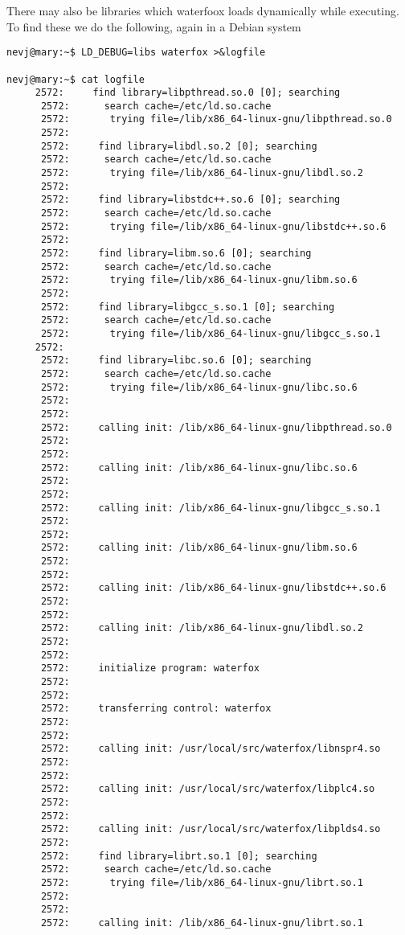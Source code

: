 \documentclass[a4paper]{article}  %
\begin{document}
 There may also be libraries which waterfoox loads dynamically while executing. To find these we do the following, again in a Debian system
\begin{tcolorbox}
\begin{verbatim}
nevj@mary:~$ LD_DEBUG=libs waterfox >&logfile

nevj@mary:~$ cat logfile
     2572:     find library=libpthread.so.0 [0]; searching
      2572:      search cache=/etc/ld.so.cache
      2572:       trying file=/lib/x86_64-linux-gnu/libpthread.so.0
      2572:
      2572:     find library=libdl.so.2 [0]; searching
      2572:      search cache=/etc/ld.so.cache
      2572:       trying file=/lib/x86_64-linux-gnu/libdl.so.2
      2572:
      2572:     find library=libstdc++.so.6 [0]; searching
      2572:      search cache=/etc/ld.so.cache
      2572:       trying file=/lib/x86_64-linux-gnu/libstdc++.so.6
      2572:
      2572:     find library=libm.so.6 [0]; searching
      2572:      search cache=/etc/ld.so.cache
      2572:       trying file=/lib/x86_64-linux-gnu/libm.so.6
      2572:
      2572:     find library=libgcc_s.so.1 [0]; searching
      2572:      search cache=/etc/ld.so.cache
      2572:       trying file=/lib/x86_64-linux-gnu/libgcc_s.so.1
     2572:
      2572:     find library=libc.so.6 [0]; searching
      2572:      search cache=/etc/ld.so.cache
      2572:       trying file=/lib/x86_64-linux-gnu/libc.so.6
      2572:
      2572:
      2572:     calling init: /lib/x86_64-linux-gnu/libpthread.so.0
      2572:
      2572:
      2572:     calling init: /lib/x86_64-linux-gnu/libc.so.6
      2572:
      2572:
      2572:     calling init: /lib/x86_64-linux-gnu/libgcc_s.so.1
      2572:
      2572:
      2572:     calling init: /lib/x86_64-linux-gnu/libm.so.6
      2572:
      2572:
      2572:     calling init: /lib/x86_64-linux-gnu/libstdc++.so.6
      2572:
      2572:
      2572:     calling init: /lib/x86_64-linux-gnu/libdl.so.2
      2572:
      2572:
      2572:     initialize program: waterfox
      2572:
      2572:
      2572:     transferring control: waterfox
      2572:
      2572:
      2572:     calling init: /usr/local/src/waterfox/libnspr4.so
      2572:
      2572:
      2572:     calling init: /usr/local/src/waterfox/libplc4.so
      2572:
      2572:
      2572:     calling init: /usr/local/src/waterfox/libplds4.so
      2572:
      2572:     find library=librt.so.1 [0]; searching
      2572:      search cache=/etc/ld.so.cache
      2572:       trying file=/lib/x86_64-linux-gnu/librt.so.1
      2572:
      2572:
      2572:     calling init: /lib/x86_64-linux-gnu/librt.so.1

\end{verbatim}
\end{tcolorbox}
\end{document}
